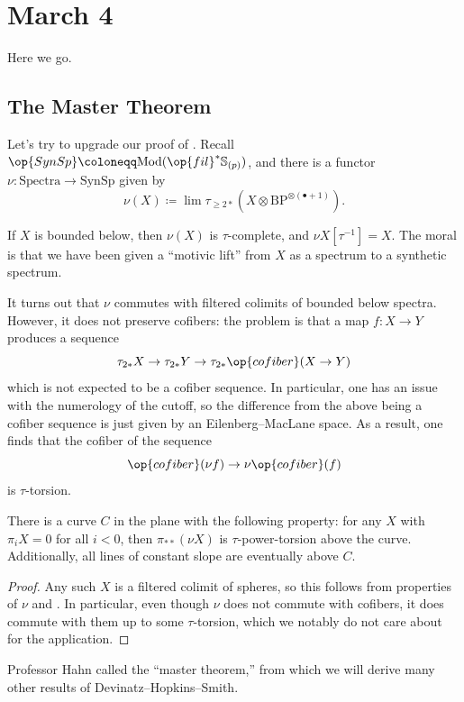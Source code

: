 \documentclass[../notes.tex]{subfiles}
\begin{document}
\section{March 4}
Here we go.

\subsection{The Master Theorem}
Let's try to upgrade our proof of . Recall $\op{SynSp}\coloneqq\mathrm{Mod}(\op{fil}^*\mathbb S_{(p)})$, and there is a functor $\nu\colon\mathrm{Spectra}\to\mathrm{SynSp}$ given by
\[\nu(X)\coloneqq\lim\tau_{\ge2*}(X\otimes\mathrm{BP}^{\otimes(\bullet+1)}).\]
\begin{remark}
	If $X$ is bounded below, then $\nu(X)$ is $\tau$-complete, and $\nu X\left[\tau^{-1}\right]=X$. The moral is that we have been given a ``motivic lift'' from $X$ as a spectrum to a synthetic spectrum.
\end{remark}
\begin{remark}
	It turns out that $\nu$ commutes with filtered colimits of bounded below spectra. However, it does not preserve co\-fibers: the problem is that a map $f\colon X\to Y$ produces a sequence
	\[\tau_{2*}X\to\tau_{2*}Y\to\tau_{2*}\op{cofiber}(X\to Y)\]
	which is not expected to be a cofiber sequence. In particular, one has an issue with the numerology of the cutoff, so the difference from the above being a cofiber sequence is just given by an Eilenberg--MacLane space. As a result, one finds that the cofiber of the sequence
	\[\op{cofiber}(\nu f)\to\nu\op{cofiber}(f)\]
	is $\tau$-torsion.
\end{remark}
\begin{theorem} \label{thm:master-thm}
	There is a curve $C$ in the plane with the following property: for any $X$ with $\pi_iX=0$ for all $i<0$, then $\pi_{**}(\nu X)$ is $\tau$-power-torsion above the curve. Additionally, all lines of constant slope are eventually above $C$.
\end{theorem}
\begin{proof}
	Any such $X$ is a filtered colimit of spheres, so this follows from properties of $\nu$ and . In particular, even though $\nu$ does not commute with cofibers, it does commute with them up to some $\tau$-torsion, which we notably do not care about for the application.
\end{proof}
Professor Hahn called  the ``master theorem,'' from which we will derive many other results of Devinatz--Hopkins--Smith.
\end{document}
